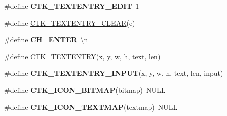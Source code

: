\begin{DoxyCompactItemize}
\item 
\hypertarget{group__ctkappfunc_gadab7e3e96f0cd8ddf5e51c282df1627a}{}\#define {\bfseries C\+T\+K\+\_\+\+T\+E\+X\+T\+E\+N\+T\+R\+Y\+\_\+\+E\+D\+I\+T}~1\label{group__ctkappfunc_gadab7e3e96f0cd8ddf5e51c282df1627a}

\item 
\#define \hyperlink{group__ctkappfunc_ga9f8a1dee82b77b2da47fc17e459e200b}{C\+T\+K\+\_\+\+T\+E\+X\+T\+E\+N\+T\+R\+Y\+\_\+\+C\+L\+E\+A\+R}(e)
\item 
\hypertarget{group__ctkappfunc_gabc83812b9b3909f3146b0014d7977168}{}\#define {\bfseries C\+H\+\_\+\+E\+N\+T\+E\+R}~\textquotesingle{}\textbackslash{}n\textquotesingle{}\label{group__ctkappfunc_gabc83812b9b3909f3146b0014d7977168}

\item 
\#define \hyperlink{group__ctkappfunc_gac3a7af33fd7e76b56b8dde00da865bc0}{C\+T\+K\+\_\+\+T\+E\+X\+T\+E\+N\+T\+R\+Y}(x,  y,  w,  h,  text,  len)
\item 
\#define {\bfseries C\+T\+K\+\_\+\+T\+E\+X\+T\+E\+N\+T\+R\+Y\+\_\+\+I\+N\+P\+U\+T}(x,  y,  w,  h,  text,  len,  input)
\item 
\hypertarget{group__ctkappfunc_ga913475677fd79af099fe45f1eef27922}{}\#define {\bfseries C\+T\+K\+\_\+\+I\+C\+O\+N\+\_\+\+B\+I\+T\+M\+A\+P}(bitmap)~N\+U\+L\+L\label{group__ctkappfunc_ga913475677fd79af099fe45f1eef27922}

\item 
\hypertarget{group__ctkappfunc_ga7e104723c21595d899a6285c71ab9e4a}{}\#define {\bfseries C\+T\+K\+\_\+\+I\+C\+O\+N\+\_\+\+T\+E\+X\+T\+M\+A\+P}(textmap)~N\+U\+L\+L\label{group__ctkappfunc_ga7e104723c21595d899a6285c71ab9e4a}


\end{DoxyCompactItemize}
